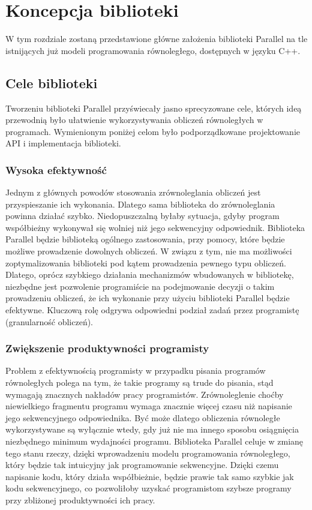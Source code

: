 
\chapter{Koncepcja biblioteki}\label{r:koncepcja}

  W tym rozdziale zostaną przedstawione główne założenia biblioteki Parallel na tle istnijących już modeli programowania równoległego, dostępnych w języku C++.

\section{Cele biblioteki}

  Tworzeniu biblioteki Parallel przyświecały jasno sprecyzowane cele, których ideą przewodnią było ułatwienie wykorzystywania obliczeń równoległych w programach.
  Wymienionym poniżej celom było podporządkowane projektowanie API i implementacja biblioteki.

\subsection{Wysoka efektywność}

  Jednym z głównych powodów stosowania zrównoleglania obliczeń jest przyspieszanie ich wykonania. Dlatego sama biblioteka do zrównoleglania powinna działać szybko.
  Niedopuszczalną byłaby sytuacja, gdyby program współbieżny wykonywał się wolniej niż jego sekwencyjny odpowiednik.
  Biblioteka Parallel będzie biblioteką ogólnego zastosowania, przy pomocy, które będzie możliwe prowadzenie dowolnych obliczeń.
  W związu z tym, nie ma możliwości zoptymalizowania biblioteki pod kątem prowadzenia pewnego typu obliczeń.
  Dlatego, oprócz szybkiego działania mechanizmów wbudowanych w bibliotekę, niezbędne jest pozwolenie programiście na podejmowanie decyzji o takim prowadzeniu obliczeń, że ich wykonanie przy użyciu biblioteki Parallel będzie efektywne.
  Kluczową rolę odgrywa odpowiedni podział zadań przez programistę (granularność obliczeń).
  
\subsection{Zwiększenie produktywności programisty}
  Problem z efektywnością programisty w przypadku pisania programów równoległych polega na tym, że takie programy są trude do pisania, stąd wymagają znacznych nakładów pracy programistów.
  Zrównoleglenie choćby niewielkiego fragmentu programu wymaga znacznie więcej czasu niż napisanie jego sekwencyjnego odpowiednika.
  Być może dlatego obliczenia równoległe wykorzystywane są wyłącznie wtedy, gdy już nie ma innego sposobu osiągnięcia niezbędnego minimum wydajności programu.
  Biblioteka Parallel celuje w zmianę tego stanu rzeczy, dzięki wprowadzeniu modelu programowania równoległego, który będzie tak intuicyjny jak programowanie sekwencyjne.
  Dzięki czemu napisanie kodu, który działa współbieżnie, będzie prawie tak samo szybkie jak kodu sekwencyjnego, co pozwoliłoby uzyskać programistom szybsze programy przy zbliżonej produktywności ich pracy.

